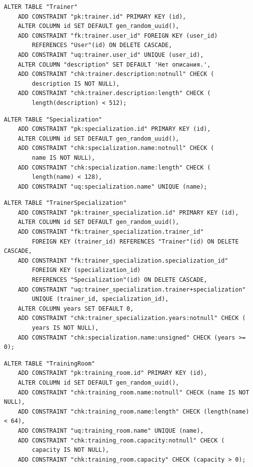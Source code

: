 \begin{lstlisting}[label=alg:16, caption=Реализация  ограничений целостности данных отношения Trainer, captionpos=t]
ALTER TABLE "Trainer"
	ADD CONSTRAINT "pk:trainer.id" PRIMARY KEY (id),
	ALTER COLUMN id SET DEFAULT gen_random_uuid(),
	ADD CONSTRAINT "fk:trainer.user_id" FOREIGN KEY (user_id) 
		REFERENCES "User"(id) ON DELETE CASCADE,
	ADD CONSTRAINT "uq:trainer.user_id" UNIQUE (user_id),
	ALTER COLUMN "description" SET DEFAULT 'Нет описания.',
	ADD CONSTRAINT "chk:trainer.description:notnull" CHECK (
		description IS NOT NULL),
	ADD CONSTRAINT "chk:trainer.description:length" CHECK (
		length(description) < 512);
\end{lstlisting}

\begin{lstlisting}[label=alg:17, caption=Реализация  ограничений целостности данных отношения Specialization, captionpos=t]
ALTER TABLE "Specialization"
	ADD CONSTRAINT "pk:specialization.id" PRIMARY KEY (id),
	ALTER COLUMN id SET DEFAULT gen_random_uuid(),
	ADD CONSTRAINT "chk:specialization.name:notnull" CHECK (
		name IS NOT NULL),
	ADD CONSTRAINT "chk:specialization.name:length" CHECK (
		length(name) < 128),
	ADD CONSTRAINT "uq:specialization.name" UNIQUE (name);
\end{lstlisting}

\begin{lstlisting}[label=alg:18, caption=Реализация  ограничений целостности данных отношения TrainerSpecialization, captionpos=t]
ALTER TABLE "TrainerSpecialization"
	ADD CONSTRAINT "pk:trainer_specialization.id" PRIMARY KEY (id),
	ALTER COLUMN id SET DEFAULT gen_random_uuid(),
	ADD CONSTRAINT "fk:trainer_specialization.trainer_id" 
		FOREIGN KEY (trainer_id) REFERENCES "Trainer"(id) ON DELETE CASCADE,
	ADD CONSTRAINT "fk:trainer_specialization.specialization_id" 
		FOREIGN KEY (specialization_id) 
		REFERENCES "Specialization"(id) ON DELETE CASCADE,
	ADD CONSTRAINT "uq:trainer_specialization.trainer+specialization" 
		UNIQUE (trainer_id, specialization_id),
	ALTER COLUMN years SET DEFAULT 0,
	ADD CONSTRAINT "chk:trainer_specialization.years:notnull" CHECK (
		years IS NOT NULL),
	ADD CONSTRAINT "chk:specialization.name:unsigned" CHECK (years >= 0);
\end{lstlisting}

\begin{lstlisting}[label=alg:20, caption=Реализация  ограничений целостности данных отношения TrainingRoom, captionpos=t]
ALTER TABLE "TrainingRoom"
	ADD CONSTRAINT "pk:training_room.id" PRIMARY KEY (id),
	ALTER COLUMN id SET DEFAULT gen_random_uuid(),
	ADD CONSTRAINT "chk:training_room.name:notnull" CHECK (name IS NOT NULL),
	ADD CONSTRAINT "chk:training_room.name:length" CHECK (length(name) < 64),
	ADD CONSTRAINT "uq:training_room.name" UNIQUE (name),
	ADD CONSTRAINT "chk:training_room.capacity:notnull" CHECK (
		capacity IS NOT NULL),
	ADD CONSTRAINT "chk:training_room.capacity" CHECK (capacity > 0);
\end{lstlisting}

